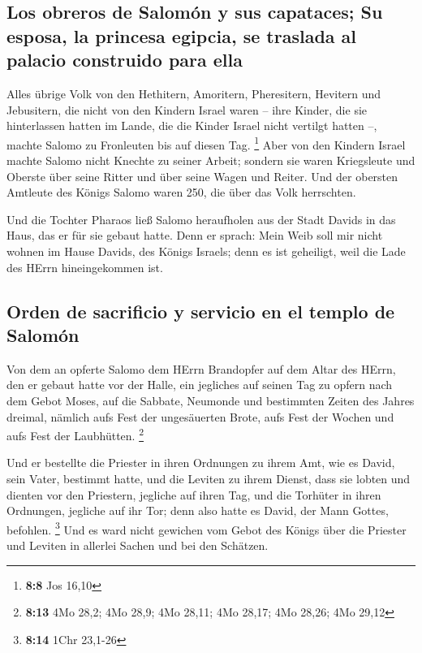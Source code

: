 \hypertarget{los-obreros-de-salomuxf3n-y-sus-capataces-su-esposa-la-princesa-egipcia-se-traslada-al-palacio-construido-para-ella}{%
\subsection{Los obreros de Salomón y sus capataces; Su esposa, la
princesa egipcia, se traslada al palacio construido para
ella}\label{los-obreros-de-salomuxf3n-y-sus-capataces-su-esposa-la-princesa-egipcia-se-traslada-al-palacio-construido-para-ella}}

 Alles übrige Volk von den Hethitern, Amoritern,
Pheresitern, Hevitern und Jebusitern, die nicht von den Kindern Israel
waren --  ihre Kinder, die sie hinterlassen hatten im
Lande, die die Kinder Israel nicht vertilgt hatten --, machte Salomo zu
Fronleuten bis auf diesen Tag. \footnote{\textbf{8:8} Jos 16,10}
 Aber von den Kindern Israel machte Salomo nicht Knechte
zu seiner Arbeit; sondern sie waren Kriegsleute und Oberste über seine
Ritter und über seine Wagen und Reiter.  Und der obersten
Amtleute des Königs Salomo waren 250, die über das Volk herrschten.

 Und die Tochter Pharaos ließ Salomo heraufholen aus der
Stadt Davids in das Haus, das er für sie gebaut hatte. Denn er sprach:
Mein Weib soll mir nicht wohnen im Hause Davids, des Königs Israels;
denn es ist geheiligt, weil die Lade des HErrn hineingekommen ist.

\hypertarget{orden-de-sacrificio-y-servicio-en-el-templo-de-salomuxf3n}{%
\subsection{Orden de sacrificio y servicio en el templo de
Salomón}\label{orden-de-sacrificio-y-servicio-en-el-templo-de-salomuxf3n}}

 Von dem an opferte Salomo dem HErrn Brandopfer auf dem
Altar des HErrn, den er gebaut hatte vor der Halle,  ein
jegliches auf seinen Tag zu opfern nach dem Gebot Moses, auf die
Sabbate, Neumonde und bestimmten Zeiten des Jahres dreimal, nämlich aufs
Fest der ungesäuerten Brote, aufs Fest der Wochen und aufs Fest der
Laubhütten. \footnote{\textbf{8:13} 4Mo 28,2; 4Mo 28,9; 4Mo 28,11; 4Mo
  28,17; 4Mo 28,26; 4Mo 29,12}

 Und er bestellte die Priester in ihren Ordnungen zu
ihrem Amt, wie es David, sein Vater, bestimmt hatte, und die Leviten zu
ihrem Dienst, dass sie lobten und dienten vor den Priestern, jegliche
auf ihren Tag, und die Torhüter in ihren Ordnungen, jegliche auf ihr
Tor; denn also hatte es David, der Mann Gottes, befohlen. \footnote{\textbf{8:14}
  1Chr 23,1-26}  Und es ward nicht gewichen vom Gebot des
Königs über die Priester und Leviten in allerlei Sachen und bei den
Schätzen.

